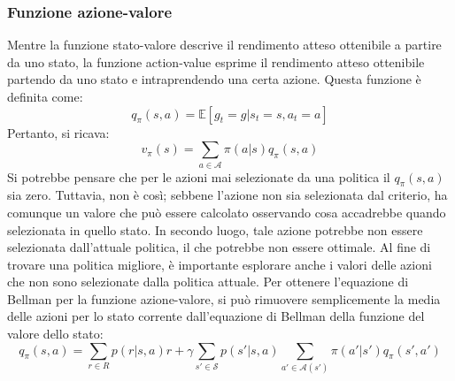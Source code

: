\subsubsection{Funzione azione-valore}
Mentre la funzione stato-valore descrive il rendimento atteso ottenibile a partire da uno stato, la funzione action-value esprime il rendimento atteso ottenibile partendo da uno stato e intraprendendo una certa azione. Questa funzione è definita come:
\begin{equation}q_\pi(s,a)=\mathbb{E}[g_t=g|s_t=s,a_t=a]\end{equation}
Pertanto, si ricava:
\begin{equation}v_\pi(s)=\sum_{a \in \mathcal{A}}\pi(a|s)q_\pi(s,a)\end{equation}
Si potrebbe pensare che per le azioni mai selezionate da una politica il $q_\pi(s,a)$ sia zero. Tuttavia, non è così; sebbene l'azione non sia selezionata dal criterio, ha comunque un valore che può essere calcolato osservando cosa accadrebbe quando selezionata in quello stato. In secondo luogo, tale azione potrebbe non essere selezionata dall'attuale politica, il che potrebbe non essere ottimale. Al fine di trovare una politica migliore, è importante esplorare anche i valori delle azioni che non sono selezionate dalla politica attuale. Per ottenere l'equazione di Bellman per la funzione azione-valore, si può rimuovere semplicemente la media delle azioni per lo stato corrente dall'equazione di Bellman della funzione del valore dello stato:
\begin{equation}q_\pi(s,a)= \sum_{r\in R} p(r|s,a)r+\gamma \sum_{s'\in \mathcal{S}}p(s'|s,a)\sum_{a' \in \mathcal{A}(s')}\pi(a'|s')q_\pi(s',a')\end{equation}


